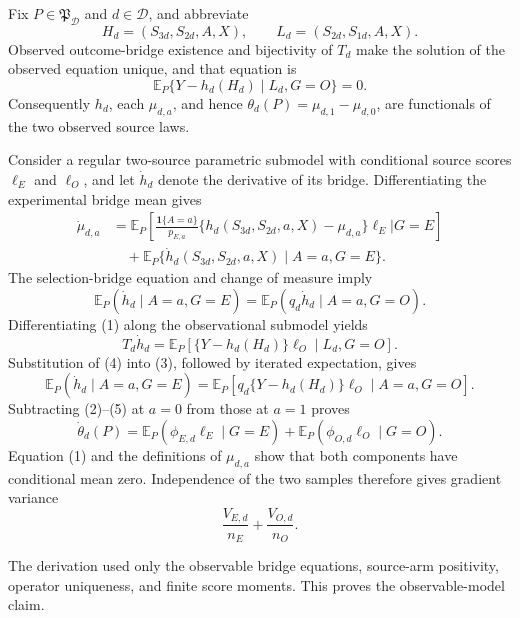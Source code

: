 Fix \(P\in\mathfrak P_{\mathcal D}\) and \(d\in\mathcal D\), and abbreviate
\[
 H_d=(S_{3d},S_{2d},A,X),\qquad L_d=(S_{2d},S_{1d},A,X).
\]
Observed outcome-bridge existence and bijectivity of \(T_d\) make the solution of the observed equation unique, and that equation is
\[
 \mathbb E_P\{Y-h_d(H_d)\mid L_d,G=O\}=0. \tag{1}
\]
Consequently \(h_d\), each \(\mu_{d,a}\), and hence \(\theta_d(P)=\mu_{d,1}-\mu_{d,0}\), are functionals of the two observed source laws.

Consider a regular two-source parametric submodel with conditional source scores \(\ell_E\) and \(\ell_O\), and let \(\dot h_d\) denote the derivative of its bridge.  Differentiating the experimental bridge mean gives
\[
\begin{aligned}
 \dot\mu_{d,a}
 &=\mathbb E_P\!\left[
   \frac{\mathbf 1\{A=a\}}{p_{E,a}}
   \{h_d(S_{3d},S_{2d},a,X)-\mu_{d,a}\}\ell_E
   \mathrel{\Big|}G=E\right]\\
 &\quad+\mathbb E_P\{\dot h_d(S_{3d},S_{2d},a,X)\mid A=a,G=E\}.
\end{aligned}\tag{2}
\]
The selection-bridge equation and change of measure imply
\[
 \mathbb E_P(\dot h_d\mid A=a,G=E)
 =\mathbb E_P(q_d\dot h_d\mid A=a,G=O). \tag{3}
\]
Differentiating (1) along the observational submodel yields
\[
 T_d\dot h_d
 =\mathbb E_P[\{Y-h_d(H_d)\}\ell_O\mid L_d,G=O]. \tag{4}
\]
Substitution of (4) into (3), followed by iterated expectation, gives
\[
 \mathbb E_P(\dot h_d\mid A=a,G=E)
 =\mathbb E_P[q_d\{Y-h_d(H_d)\}\ell_O\mid A=a,G=O]. \tag{5}
\]
Subtracting (2)--(5) at \(a=0\) from those at \(a=1\) proves
\[
 \dot\theta_d(P)
 =\mathbb E_P(\phi_{E,d}\ell_E\mid G=E)
  +\mathbb E_P(\phi_{O,d}\ell_O\mid G=O). \tag{6}
\]
Equation (1) and the definitions of \(\mu_{d,a}\) show that both components have conditional mean zero.  Independence of the two samples therefore gives gradient variance
\[
 \frac{V_{E,d}}{n_E}+\frac{V_{O,d}}{n_O}. \tag{7}
\]

The derivation used only the observable bridge equations, source-arm positivity, operator uniqueness, and finite score moments. This proves the observable-model claim.